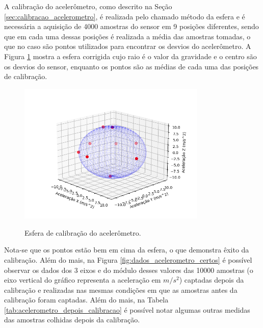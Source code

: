 \documentclass[acronym, symbols, table]{fei}
\begin{document}
	A calibração do acelerômetro, como descrito na Seção \ref{sec:calibracao_acelerometro}, é realizada pelo chamado método da esfera e é necessária a aquisição de 4000 amostras do sensor em 9 posições diferentes, sendo que em cada uma dessas posições é realizada a média das amostras tomadas, o que no caso são pontos utilizados para encontrar os desvios do acelerômetro. A Figura \ref{fig:dados_esfera_certo} mostra a esfera corrigida cujo raio é o valor da gravidade e o centro são os desvios do sensor, enquanto os pontos são as médias de cada uma das posições de calibração.
	
	\begin{figure}[!htb]
		\centering
		\caption{Esfera de calibração do acelerômetro.}
		\includegraphics[width=0.8\textwidth]{dados_esfera_correto.png}
		\label{fig:dados_esfera_certo}
	\end{figure}
	
	Nota-se que os pontos estão bem em cima da esfera, o que demonstra êxito da calibração. Além do mais, na Figura \ref{fig:dados_acelerometro_certos} é possível observar os dados dos 3 eixos e do módulo desses valores das 10000 amostras (o eixo vertical do gráfico representa a aceleração em $m/s^2$) captadas depois da calibração e realizadas nas mesmas condições em que as amostras antes da calibração foram captadas. Além do mais, na Tabela \ref{tab:acelerometro_depois_calibracao} é possível notar algumas outras medidas das amostras colhidas depois da calibração.
	
\end{document}
